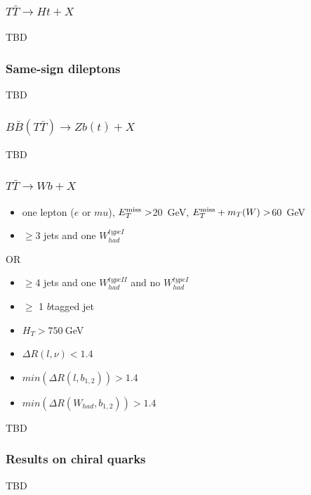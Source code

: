 \documentclass[xcolor=dvipsnames,10pt]{beamer}
\newcommand\BackgroundPicture[1]{%
   \setbeamertemplate{background}{%
   \parbox[c][\paperheight]{\paperwidth}{%
       \vfill \hfill
\texttt{[image: \#1]}
        \hfill \vfill
     }}}
\begin{document}
\begin{frame}\frametitle{$T\bar{T}\to Ht+X$~\cite{ATLAS-CONF-2013-018}}
\footnotesize\centering

TBD
\end{frame}

\begin{frame}\frametitle{Same-sign dileptons~\cite{ATLAS-CONF-2013-051}}
\footnotesize\centering

TBD
\end{frame}

\begin{frame}\frametitle{$B\bar{B}(T\bar{T})\to Zb(t)+X$~\cite{ATLAS-CONF-2013-056}}
\footnotesize\centering

TBD
\end{frame}

\begin{frame}\frametitle{$T\bar{T}\to Wb+X$~\cite{ATLAS-CONF-2013-060}}
\footnotesize\centering


    \begin{itemize}
    \item one lepton ($e$ or $mu$), ${E}^{\rm miss}_T >$20~GeV, ${E}^{\rm miss}_T + m_T(W)>$60~GeV
    \item $\geq$3 jets and one $W^{type I}_{had}$
    \end{itemize}
    OR 
    \begin{itemize}
    \item $\geq$4 jets and one $W^{type II}_{had}$ and no $W^{type I}_{had}$%
    \item $\geq$ 1 $b$tagged jet
    \item $H_T>750~$GeV
    \item $\Delta R(l,\nu) < 1.4$
    \item $min(\Delta R(l,b_{1,2})) > 1.4$
    \item $min(\Delta R(W_{had},b_{1,2})) > 1.4$
    \end{itemize}

TBD
\end{frame}



\begin{frame}\frametitle{Results on chiral quarks}
\footnotesize\centering

TBD
\end{frame}





\BackgroundPicture{pics/atlas}
\end{document}
